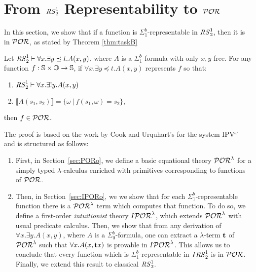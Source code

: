 \section{From ${\mathit{RS}^1_2}$ Representability to $\mathcal{POR}$}
\label{sec:TaskB}


In this section, we show
that if a function is
$\Sigma^b_1$-representable
in ${\mathit{RS}^1_2}$,
then it is in $\mathcal{POR}$, as stated by Theorem \ref{thm:taskB}


\begin{theorem}\label{thm:taskB}
Let ${\mathit{RS}^1_2} \vdash \forall x.\exists y\preceq t.A(x,y)$,
where $A$ is a $\Sigma^b_1$-formula
with only $x,y$ free.
For any function $f:\mathbb{S}\times \mathbb{O} \rightarrow \mathbb{S}$,
if $\forall x.\exists y\preceq t. A(x,y)$
represents $f$ so that:
\begin{enumerate}
\itemsep0em
\item ${\mathit{RS}^1_2} \vdash \forall x.\exists !y.A(x,y)$
\item $\llbracket A(s_1,s_2)\rrbracket =
\{\omega \ | \ f(s_1,\omega)=s_2\}$,
\end{enumerate}
then $f\in \mathcal{POR}$.
\end{theorem}


The proof is based on the work by Cook and Urquhart's
for the system IPV$^\omega$~\cite{CookUrquhart}
and is structured as follows:
\begin{enumerate}
\itemsep0em
\item
First, in Section~\ref{sec:PORo},
we define
a basic equational theory
$\mathcal{POR}^\lambda$
for a simply typed $\lambda$-calculus
enriched with primitives corresponding
to functions of $\mathcal{POR}$.

\item
Then, in Section~\ref{sec:IPORo},
we we show that for each $\Sigma^b_1$-representable function
there is a $\mathcal{POR}^\lambda$ term which computes that function.
To do so, we define a
first-order \emph{intuitionist} theory
$I\mathcal{POR}^\lambda$, which extends
$\mathcal{POR}^\lambda$ with usual predicate calculus. Then,
we show that from any derivation of
$\forall x.\exists y.A(x,y)$,
where $A$ is a $\Sigma^b_0$-formula,
one can extract a $\lambda$-term
${\mathbf t}$ of $\mathcal{POR}^\lambda$
such that $\forall x.A(x,{\mathbf t} x)$
is provable {in $I\mathcal{POR}^\lambda$}.
This allows us to conclude
that every function which is $\Sigma^b_1$-representable
in $I{\mathit{RS}^1_2}$ is in $\mathcal{POR}$. Finally,
we extend this result to classical
${\mathit{RS}^1_2}$.
\end{enumerate}

